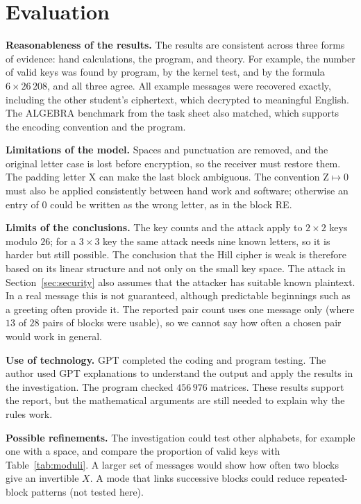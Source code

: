 \documentclass[11pt,a4paper]{article}
\theoremstyle{plain}
\theoremstyle{definition}
\begin{document}
\section{Evaluation}\label{sec:eval}

\textbf{Reasonableness of the results.} The results are consistent across three forms of evidence: hand calculations, the program, and theory. For example, the number of valid keys was found by program, by the kernel test, and by the formula $6\times26\,208$, and all three agree. All example messages were recovered exactly, including the other student's ciphertext, which decrypted to meaningful English. The ALGEBRA benchmark from the task sheet also matched, which supports the encoding convention and the program.

\textbf{Limitations of the model.} Spaces and punctuation are removed, and the original letter case is lost before encryption, so the receiver must restore them. The padding letter X can make the last block ambiguous. The convention $\text{Z}\mapsto0$ must also be applied consistently between hand work and software; otherwise an entry of $0$ could be written as the wrong letter, as in the block RE.

\textbf{Limits of the conclusions.} The key counts and the attack apply to $2\times2$ keys modulo $26$; for a $3\times3$ key the same attack needs nine known letters, so it is harder but still possible. The conclusion that the Hill cipher is weak is therefore based on its linear structure and not only on the small key space. The attack in Section~\ref{sec:security} also assumes that the attacker has suitable known plaintext. In a real message this is not guaranteed, although predictable beginnings such as a greeting often provide it. The reported pair count uses one message only (where $13$ of $28$ pairs of blocks were usable), so we cannot say how often a chosen pair would work in general.

\textbf{Use of technology.} GPT completed the coding and program testing. The author used GPT explanations to understand the output and apply the results in the investigation. The program checked $456\,976$ matrices. These results support the report, but the mathematical arguments are still needed to explain why the rules work.

\textbf{Possible refinements.} The investigation could test other alphabets, for example one with a space, and compare the proportion of valid keys with Table~\ref{tab:moduli}. A larger set of messages would show how often two blocks give an invertible $X$. A mode that links successive blocks could reduce repeated-block patterns (not tested here).
\end{document}
